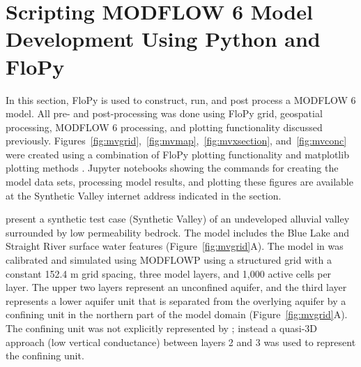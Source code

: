 \documentclass[12pt, oneside]{article}  	%
\begin{document}
\section*{Scripting MODFLOW 6 Model Development Using Python and FloPy}

In this section, FloPy is used to construct, run, and post process a MODFLOW 6 model. All pre- and post-processing was done using FloPy grid, geospatial processing, MODFLOW 6 processing, and plotting functionality discussed previously. Figures~\ref{fig:mvgrid},~\ref{fig:mvmap},~\ref{fig:mvxsection}, and~\ref{fig:mvconc} were created using a combination of FloPy plotting functionality and matplotlib plotting methods \citep{hunter2007matplotlib}. Jupyter notebooks \citep{Kluyver:2016aa} showing the commands for creating the model data sets, processing model results, and plotting these figures are available at the Synthetic Valley internet address indicated in the  section.

\cite{hill1998} present a synthetic test case (Synthetic Valley) of an undeveloped alluvial valley surrounded by low permeability bedrock. The model includes the Blue Lake and Straight River surface water features (Figure~\ref{fig:mvgrid}A). The model in \cite{hill1998} was calibrated and simulated using MODFLOWP \citep{hill1992computer} using a structured grid with a constant 152.4 m grid spacing, three model layers, and 1,000 active cells per layer. The upper two layers represent an unconfined aquifer, and the third layer represents a lower aquifer unit that is separated from the overlying aquifer by a confining unit in the northern part of the model domain (Figure~\ref{fig:mvgrid}A). The confining unit was not explicitly represented by \cite{hill1998}; instead a quasi-3D approach (low vertical conductance) between layers 2 and 3 was used to represent the confining unit.

\end{document}
